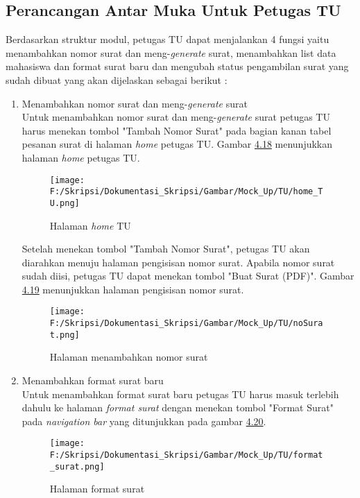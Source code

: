 \subsection{Perancangan Antar Muka Untuk Petugas TU}
\label{sec:perancangan_antar_muka_petugas_tu}
Berdasarkan struktur modul, petugas TU dapat menjalankan 4 fungsi yaitu menambahkan nomor surat dan meng-\textit{generate} surat, menambahkan list data mahasiswa dan format surat baru dan mengubah status pengambilan surat yang sudah dibuat yang akan dijelaskan sebagai berikut :
\begin{enumerate}
	\item Menambahkan nomor surat dan meng-\textit{generate} surat \\
	Untuk menambahkan nomor surat dan meng-\textit{generate} surat petugas TU harus menekan tombol "Tambah Nomor Surat" pada bagian kanan tabel pesanan surat di halaman \textit{home} petugas TU. Gambar \hyperlink{halaman_home_TU}{4.18} menunjukkan halaman \textit{home} petugas TU.
	\begin{figure}[H]
	\centering
		\texttt{[image: F:/Skripsi/Dokumentasi\_Skripsi/Gambar/Mock\_Up/TU/home\_TU.png]}
		\caption{Halaman \textit{home} TU}
		\label{fig:halaman_home_TU}
	\end{figure}
	
	Setelah menekan tombol "Tambah Nomor Surat", petugas TU akan diarahkan menuju halaman pengisisan nomor surat. Apabila nomor surat sudah diisi, petugas TU dapat menekan tombol "Buat Surat (PDF)". Gambar \hyperlink{isi_nomor_surat}{4.19} menunjukkan halaman pengisisan nomor surat.
	\begin{figure}[H]
	\centering
		\texttt{[image: F:/Skripsi/Dokumentasi\_Skripsi/Gambar/Mock\_Up/TU/noSurat.png]}
		\caption{Halaman menambahkan nomor surat}
		\label{fig:isi_nomor_surat}
	\end{figure}
	
	\item Menambahkan format surat baru\\
	Untuk menambahkan format surat baru petugas TU harus masuk terlebih dahulu ke halaman \textit{format surat} dengan menekan tombol "Format Surat" pada \textit{navigation bar} yang ditunjukkan pada gambar \hyperlink{halaman_format_surat}{4.20}.
	\begin{figure}[H]
	\centering
		\texttt{[image: F:/Skripsi/Dokumentasi\_Skripsi/Gambar/Mock\_Up/TU/format\_surat.png]}
		\caption{Halaman format surat}
		\label{fig:halaman_format_surat}
	\end{figure}
	

\end{enumerate}
